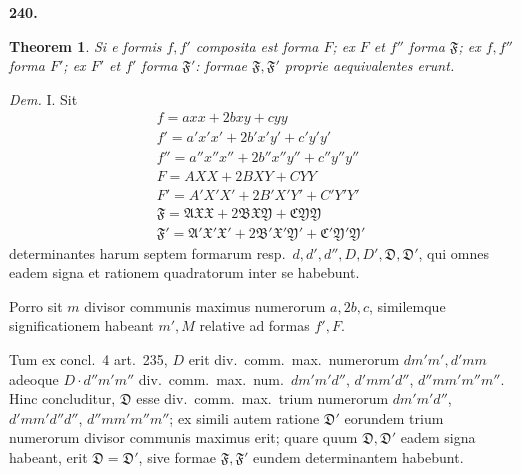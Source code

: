 \documentclass[12pt,a4paper]{article}
\theoremstyle{plain}
\newtheorem{theorem}{Theorem}[section]
\theoremstyle{definition}
\theoremstyle{remark}
\theoremstyle{problemstyle}
\begin{document}
\textbf{240.}
\begin{theorem}
Si e formis $f, f'$ composita est forma $F$; ex $F$ et $f''$ forma $\mathfrak{F}$; ex $f, f''$ forma $F'$; ex $F'$ et $f'$ forma $\mathfrak{F}'$: formae $\mathfrak{F}, \mathfrak{F}'$ proprie aequivalentes erunt.
\end{theorem}

\emph{Dem.} I. Sit
\begin{gather*}
f = axx + 2bxy + cyy \\
f' = a'x'x' + 2b'x'y' + c'y'y' \\
f'' = a''x''x'' + 2b''x''y'' + c''y''y'' \\
F = AXX + 2BXY + CYY \\
F' = A'X'X' + 2B'X'Y' + C'Y'Y' \\
\mathfrak{F} = \mathfrak{A}\mathfrak{XX} + 2\mathfrak{B}\mathfrak{XY} + \mathfrak{C}\mathfrak{YY} \\
\mathfrak{F}' = \mathfrak{A}'\mathfrak{X}'\mathfrak{X}' + 2\mathfrak{B}'\mathfrak{X}'\mathfrak{Y}' + \mathfrak{C}'\mathfrak{Y}'\mathfrak{Y}'
\end{gather*}
determinantes harum septem formarum resp.\ $d, d', d'', D, D', \mathfrak{D}, \mathfrak{D}'$, qui omnes eadem signa et rationem quadratorum inter se habebunt.

Porro sit $m$ divisor communis maximus numerorum $a, 2b, c$, similemque significationem habeant $m', M$ relative ad formas $f', F$.

Tum ex concl.\ 4 art.\ 235, $D$ erit div.\ comm.\ max.\ numerorum $dm'm', d'mm$ adeoque $D \cdot d''m'm''$ div.\ comm.\ max.\ num.\ $dm'm'd''$, $d'mm'd''$, $d''mm'm''m''$. Hinc concluditur, $\mathfrak{D}$ esse div.\ comm.\ max.\ trium numerorum $dm'm'd''$, $d'mm'd''d''$, $d''mm'm''m''$; ex simili autem ratione $\mathfrak{D}'$ eorundem trium numerorum divisor communis maximus erit; quare quum $\mathfrak{D}, \mathfrak{D}'$ eadem signa habeant, erit $\mathfrak{D} = \mathfrak{D}'$, sive formae $\mathfrak{F}, \mathfrak{F}'$ eundem determinantem habebunt.
\end{document}
